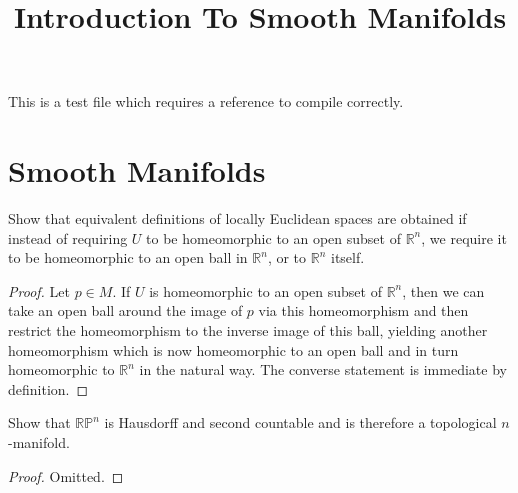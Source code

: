 


%


\title{Introduction To Smooth Manifolds}


\maketitle

\label{section-phantom}

\tableofcontents

This is a test file which requires a reference to compile correctly. \cite{Maclane}

\section{Smooth Manifolds}
\label{section-smooth-manifolds}

\begin{exercise}
\label{exercise-1-1}

Show that equivalent definitions of locally Euclidean spaces are obtained if
instead of requiring $U$ to be homeomorphic to an open subset of $\mathbb R^n$,
we require it to be homeomorphic to an open ball in $\mathbb R^n$, or to
$\mathbb R^n$ itself.

\end{exercise}

\begin{proof}

Let $p \in M$. If $U$ is homeomorphic to an open subset of $\mathbb R^n$, then
we can take an open ball around the image of $p$ via this homeomorphism and
then restrict the homeomorphism to the inverse image of this ball, yielding
another homeomorphism which is now homeomorphic to an open ball and in turn
homeomorphic to $\mathbb R^n$ in the natural way. The converse statement is
immediate by definition.

\end{proof}

\begin{exercise}
\label{exercise-1-2}

Show that $\mathbb R \mathbb P^n$ is Hausdorff and second countable and is
therefore a topological $n$-manifold.

\end{exercise}

\begin{proof}
Omitted.
\end{proof}


